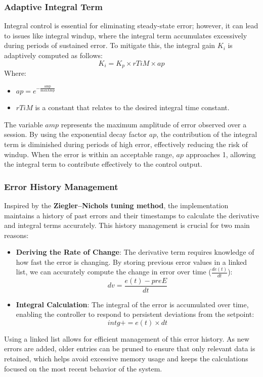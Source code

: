\documentclass[a4paper,12pt]{./article}
\begin{document}
\subsubsection{Adaptive Integral Term}
Integral control is essential for eliminating steady-state error; however, it can lead to issues like integral windup, where the integral term accumulates excessively during periods of sustained error. To mitigate this, the integral gain $K_i$ is adaptively computed as follows:
$$
K_i = K_p \times rTiM \times ap
$$
Where:
\begin{itemize}
\item $ap = e^{-\frac{\text{amp}}{\text{maxAmp}}}$
\item $rTiM$ is a constant that relates to the desired integral time constant.
\end{itemize}
The variable $amp$ represents the maximum amplitude of error observed over a session. By using the exponential decay factor $ap$, the contribution of the integral term is diminished during periods of high error, effectively reducing the risk of windup. When the error is within an acceptable range, $ap$ approaches 1, allowing the integral term to contribute effectively to the control output.
\subsubsection{Error History Management}
Inspired by the \textbf{Ziegler–Nichols tuning method}, the implementation maintains a history of past errors and their timestamps to calculate the derivative and integral terms accurately. This history management is crucial for two main reasons:
\begin{itemize}
\item \textbf{Deriving the Rate of Change}: The derivative term requires knowledge of how fast the error is changing. By storing previous error values in a linked list, we can accurately compute the change in error over time ($\frac{de(t)}{dt}$):
$$
  dv = \frac{e(t) - preE}{dt}
$$
\item \textbf{Integral Calculation}: The integral of the error is accumulated over time, enabling the controller to respond to persistent deviations from the setpoint:
$$
  intg += e(t) \times dt
$$
\end{itemize}
Using a linked list allows for efficient management of this error history. As new errors are added, older entries can be pruned to ensure that only relevant data is retained, which helps avoid excessive memory usage and keeps the calculations focused on the most recent behavior of the system.
\end{document}
